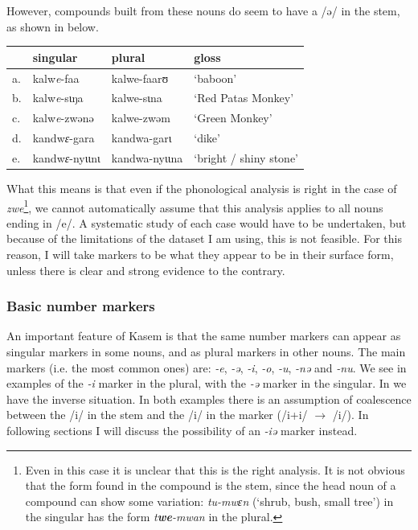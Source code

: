 However, compounds built from these nouns do seem to have a /ə/ in the stem, as shown in  below.

\begin{exe}
    \ex \label{stem-E-compounds}
    \begin{tabular}[t]{llll}
      & singular      & plural        & gloss                                          \\
      \midrule
      a. & kalw\textit{e}-faa     & kalwe-faarʊ   & `baboon'                                       \\
      b. & kalw\textit{e}-sɩŋa    & kalwe-sɩna    & `Red Patas Monkey'                             \\
      c. & kalw\textit{e}-zwənə   & kalwe-zwəm    & `Green Monkey'                                 \\
      d. & kandw\textit{ɛ}-gara   & kandwa-garɩ   & `dike' \\
      e. & kandw\textit{ɛ}-nyɩɩnɩ & kandwa-nyɩɩna & `bright / shiny stone'                         \\
    \end{tabular}
\end{exe}

What this means is that even if the phonological analysis is right in the case of \textit{zwe}\footnote{Even in this case it is unclear that this is the right analysis. It is not obvious that the form found in the compound is the stem, since the head noun of a compound can show some variation: \textit{tu-mwɛn} (`shrub, bush, small tree') in the singular has the form \textit{t\textbf{we}-mwan} in the plural.}, we cannot automatically assume that this analysis applies to all nouns ending in /e/. A systematic study of each case would have to be undertaken, but because of the limitations of the dataset I am using, this is not feasible. For this reason, I will take markers to be what they appear to be in their surface form, unless there is clear and strong evidence to the contrary.

\subsubsection{Basic number markers}

An important feature of Kasem is that the same number markers can appear as singular markers in some nouns, and as plural markers in other nouns. The main markers (i.e. the most common ones) are: \textit{-e}, \textit{-ə}, \textit{-i}, \textit{-o}, \textit{-u},  \textit{-nə} and \textit{-nu}. We see in  examples of the \textit{-i} marker in the plural, with the \textit{-ə} marker in the singular. In  we have the inverse situation. In both examples there is an assumption of coalescence between the /i/ in the stem and the /i/ in the marker (/i+i/ $\rightarrow$ /i/). In following sections I will discuss the possibility of an \textit{-iə} marker instead.

